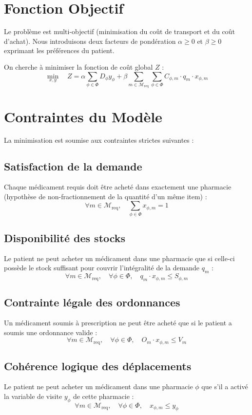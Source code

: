 \documentclass[12pt,a4paper]{report}
\begin{document}
	\section{Fonction Objectif}
	Le problème est multi-objectif (minimisation du coût de transport et du coût d'achat). Nous introduisons deux facteurs de pondération $\alpha \ge 0$ et $\beta \ge 0$ exprimant les préférences du patient. 
	
	On cherche à minimiser la fonction de coût global $Z$ :
	\[
	\min_{x, y} \quad Z = \alpha \sum_{\phi \in \Phi} D_\phi y_\phi + \beta \sum_{m \in \mathcal{M}_{\text{req}}} \sum_{\phi \in \Phi} C_{\phi, m} \cdot q_m \cdot x_{\phi, m}
	\]
	
	\section{Contraintes du Modèle}
	La minimisation est soumise aux contraintes strictes suivantes :
	
	\subsection{Satisfaction de la demande}
	Chaque médicament requis doit être acheté dans exactement une pharmacie (hypothèse de non-fractionnement de la quantité d'un même item) :
	\[
	\forall m \in \mathcal{M}_{\text{req}}, \quad \sum_{\phi \in \Phi} x_{\phi, m} = 1
	\]
	
	\subsection{Disponibilité des stocks}
	Le patient ne peut acheter un médicament dans une pharmacie que si celle-ci possède le stock suffisant pour couvrir l'intégralité de la demande $q_m$ :
	\[
	\forall m \in \mathcal{M}_{\text{req}}, \quad \forall \phi \in \Phi, \quad q_m \cdot x_{\phi, m} \le S_{\phi, m}
	\]
	
	\subsection{Contrainte légale des ordonnances}
	Un médicament soumis à prescription ne peut être acheté que si le patient a soumis une ordonnance valide :
	\[
	\forall m \in \mathcal{M}_{\text{req}}, \quad \forall \phi \in \Phi, \quad O_m \cdot x_{\phi, m} \le V_m
	\]
	
	\subsection{Cohérence logique des déplacements}
	Le patient ne peut acheter un médicament dans une pharmacie $\phi$ que s'il a activé la variable de visite $y_\phi$ de cette pharmacie :
	\[
	\forall m \in \mathcal{M}_{\text{req}}, \quad \forall \phi \in \Phi, \quad x_{\phi, m} \le y_\phi
	\]
	
\end{document}

